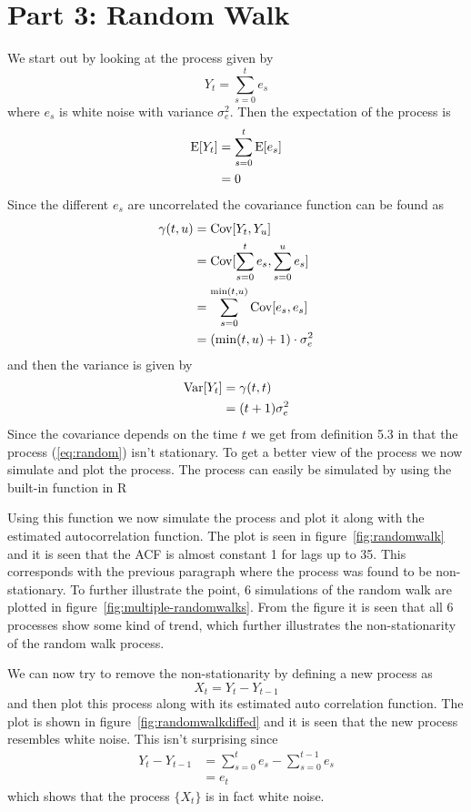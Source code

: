 \section*{Part 3: Random Walk}
We start out by looking at the process given by
\begin{equation}\label{eq:random}
    Y_t = \sum_{s=0}^t e_s
\end{equation}
where $e_s$ is white noise with variance $\sigma^2_e$. Then the expectation of the process is
\begin{align*}
    \text{E}[Y_t] &= \sum_{s=0}^t\text{E}[e_s]\\
    &= 0
\end{align*}
Since the different $e_s$ are uncorrelated the covariance function can be found as
\begin{align*}
    \gamma(t, u) &= \text{Cov}[Y_t, Y_u] \\
    &= \text{Cov}[\sum_{s=0}^t e_s, \sum_{s=0}^u e_s] \\
    &= \sum_{s=0}^{\text{min}(t, u)} \text{Cov}[e_s, e_s] \\
    &= (\text{min}(t,u) + 1)\cdot\sigma^2_e
\end{align*}
and then the variance is given by
\begin{align*}
    \text{Var}[Y_t] &= \gamma(t,t) \\
    &= (t+1)\sigma^2_e
\end{align*}
Since the covariance depends on the time $t$ we get from definition 5.3 in \cite{hm} that the process (\ref{eq:random}) isn't stationary. To get a better view of the process we now simulate and plot the process. The process can easily be simulated by using the built-in  function in R

Using this function we now simulate the process and plot it along with the estimated autocorrelation function. The plot is seen in figure~\ref{fig:randomwalk} and it is seen that the ACF is almost constant 1 for lags up to 35. This corresponds with the previous paragraph where the process was found to be non-stationary. To further illustrate the point, 6 simulations of the random walk are plotted in figure~\ref{fig:multiple-randomwalks}. From the figure it is seen that all 6 processes show some kind of trend, which further illustrates the non-stationarity of the random walk process. \par
We can now try to remove the non-stationarity by defining a new process as
\begin{equation*}
    X_t = Y_t - Y_{t-1}
\end{equation*}
and then plot this process along with its estimated auto correlation function. The plot is shown in figure~\ref{fig:randomwalkdiffed} and it is seen that the new process resembles white noise. This isn't surprising since
\begin{align*}
    Y_t - Y_{t-1} &= \sum_{s=0}^t e_s - \sum_{s=0}^{t-1} e_s \\
    &= e_t
\end{align*}
which shows that the process $\{X_t\}$ is in fact white noise.


